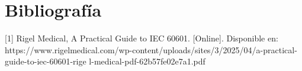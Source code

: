 \section{Bibliografía}

[1] Rigel Medical, A Practical Guide to IEC 60601. [Online]. 
Disponible en: https://www.rigelmedical.com/wp-content/uploads/sites/3/2025/04/a-practical-guide-to-iec-60601-rige
l-medical-pdf-62b57fe02e7a1.pdf